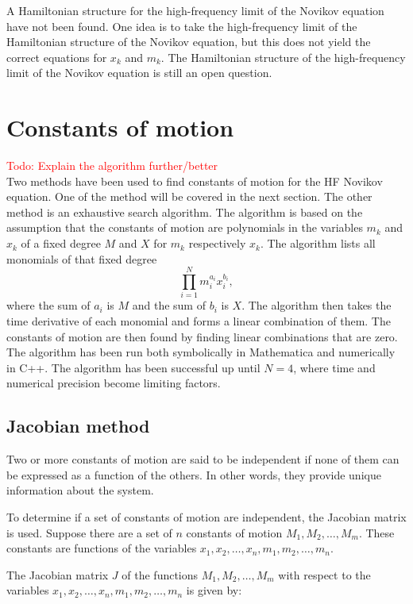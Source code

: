\documentclass[english,master]{liumaiex}
\theoremstyle{plain}
\theoremstyle{definition}
\newcommand\todo[1]{\textcolor{red}{#1}}
\begin{document}
A Hamiltonian structure for the high-frequency limit of the Novikov equation have not been found. One idea is to take the high-frequency limit of the Hamiltonian structure of the Novikov equation, but this does not yield the correct equations for $x_k$ and $m_k$. The Hamiltonian structure of the high-frequency limit of the Novikov equation is still an open question.

\section{Constants of motion}

\todo{Todo: Explain the algorithm further/better}\\
Two methods have been used to find constants of motion for the HF Novikov equation. One of the method will be covered in the next section. The other method is an exhaustive search algorithm. The algorithm is based on the assumption that the constants of motion are polynomials in the variables $m_k$ and $x_k$ of a fixed degree $M$ and $X$ for $m_k$ respectively $x_k$. The algorithm lists all monomials of that fixed degree
\begin{equation}
	\prod_{i=1}^{N} m_i^{a_i} x_i^{b_i},
\end{equation}
where the sum of $a_i$ is $M$ and the sum of $b_i$ is $X$. The algorithm then takes the time derivative of each monomial and forms a linear combination of them. The constants of motion are then found by finding linear combinations that are zero. The algorithm has been run both symbolically in Mathematica and numerically in C++. The algorithm has been successful up until $N = 4$, where time and numerical precision become limiting factors.

\subsection{Jacobian method}
Two or more constants of motion are said to be independent if none of them can be expressed as a function of the others. In other words, they provide unique information about the system.

To determine if a set of constants of motion are independent, the Jacobian matrix is used. Suppose there are a set of $n$ constants of motion $M_1,M_2,\dots,M_m$. These constants are functions of the variables $x_1,x_2,\dots,x_n,m_1,m_2,\dots,m_n$.

The Jacobian matrix $J$ of the functions ${M_1,M_2,\dots,M_m}$ with respect to the variables ${x_1,x_2,\dots,x_n,m_1,m_2,\dots,m_n}$ is given by:
\end{document}
